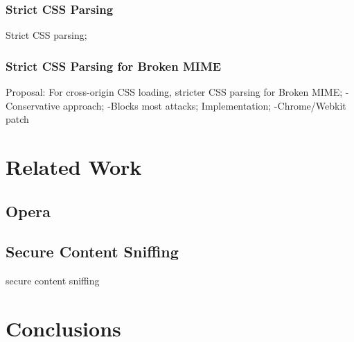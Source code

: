 \documentclass{acm_proc_article-sp}
\begin{document}
\subsubsection{Strict CSS Parsing}
Strict CSS parsing;
\subsubsection{Strict CSS Parsing for Broken MIME}
Proposal: For cross-origin CSS loading, stricter CSS parsing for Broken MIME;
-Conservative approach;
-Blocks most attacks;
Implementation;
-Chrome/Webkit patch

\section{Related Work}

\subsection{Opera}

\subsection{Secure Content Sniffing}
secure content sniffing\cite{securecontentsniffing}

\section{Conclusions}




\end{document}
